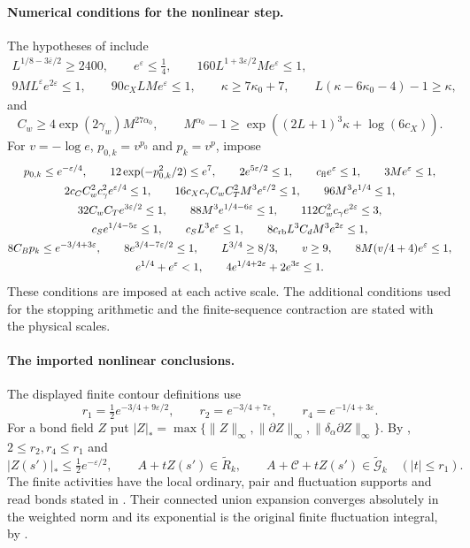 \paragraph{Numerical conditions for the nonlinear step.}
The hypotheses of \cite[Theorem A]{NonlinearStep} include
\[
 \begin{gathered}
 L^{1/8-3\bar\varepsilon/2}\ge2400,\qquad e^\varepsilon\le\tfrac14,\qquad
 160L^{1+3\varepsilon/2}Me^\varepsilon\le1,\\
 9ML^\varepsilon e^{2\varepsilon}\le1,\qquad
 90c_XLMe^\varepsilon\le1,\qquad
 \kappa\ge7\kappa_0+7,\qquad
 L(\kappa-6\kappa_0-4)-1\ge\kappa,
 \end{gathered}
\]
and
\[
 C_w\ge4\exp(2\gamma_w)M^{27\alpha_0},\qquad
 M^{\alpha_0}-1\ge\exp((2L+1)^3\kappa+\log(6c_X)).
\]
For \(v=-\log e\), \(p_{0,k}=v^{p_0}\) and \(p_k=v^p\), impose
\[
 \begin{gathered}
 p_{0,k}\le e^{-\varepsilon/4},\qquad
 12\exp(-p_{0,k}^2/2)\le e^7,\qquad 2e^{5\varepsilon/2}\le1,\qquad
 c_{\rm fl}e^\varepsilon\le1,\qquad 3Me^\varepsilon\le1,\\
 2c_CC_w^2c_\gamma^2e^{\varepsilon/4}\le1,\qquad
 16c_Xc_\gamma C_wC_T^2M^3e^{\varepsilon/2}\le1,\qquad
 96M^3e^{1/4}\le1,\\
 32C_wC_Te^{3\varepsilon/2}\le1,\qquad
 88M^3e^{1/4-6\varepsilon}\le1,\qquad
 112C_w^2c_\gamma e^{2\varepsilon}\le3,\\
 c_Se^{1/4-5\varepsilon}\le1,\qquad c_SL^3e^\varepsilon\le1,\qquad
 8c_{\rm rb}L^3C_dM^3e^{2\varepsilon}\le1,\\
 8C_Bp_k\le e^{-3/4+3\varepsilon},\qquad
 8e^{3/4-7\varepsilon/2}\le1,\qquad L^{3/4}\ge8/3,\qquad
 v\ge9,\qquad 8M(v/4+4)e^\varepsilon\le1,\\
 e^{1/4}+e^\varepsilon<1,\qquad
 4e^{1/4+2\varepsilon}+2e^{3\varepsilon}\le1.
 \end{gathered}
\]
These conditions are imposed at each active scale. The additional
conditions used for the stopping arithmetic and the finite-sequence
contraction are stated with the physical scales.

\paragraph{The imported nonlinear conclusions.}
The displayed finite contour definitions use
\[
 r_1=\tfrac12e^{-3/4+9\varepsilon/2},\qquad
 r_2=e^{-3/4+7\varepsilon},\qquad r_4=e^{-1/4+3\varepsilon}.
\]
For a bond field $Z$ put
$|Z|_* =\max\{\|Z\|_\infty,\|\partial Z\|_\infty,
\|\delta_\alpha\partial Z\|_\infty\}$.
By \cite[Proposition 5.1]{NonlinearStep},
\(2\le r_2,r_4\le r_1\) and
\[
 |Z(s')|_*\le\tfrac12e^{-\varepsilon/2},\qquad
 A+tZ(s')\in\widetilde R_k,\qquad
 A+\mathscr C+tZ(s')\in\widetilde{\mathcal G}_k
       \quad(|t|\le r_1).
\]
The finite activities have the local ordinary, pair and fluctuation
supports and read bonds stated in
\cite[Proposition 5.3]{NonlinearStep}.
Their connected union expansion converges absolutely in the weighted
norm and its exponential is the original finite fluctuation integral,
by \cite[Proposition 6.1]{NonlinearStep}.

